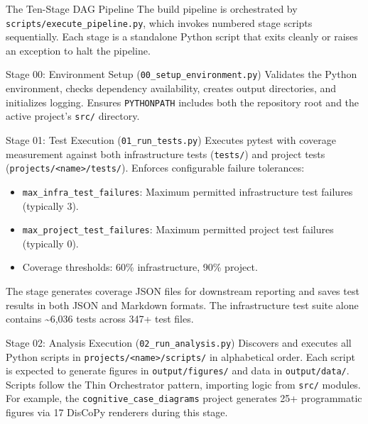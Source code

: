 \documentclass[
  ignorenonframetext,
]{beamer}
\author{\texorpdfstring{}{}}
\date{}
\providecommand{\tightlist}{%
  \setlength{\itemsep}{0pt}\setlength{\parskip}{0pt}}
\begin{document}
\begin{frame}[fragile]{The Ten-Stage DAG Pipeline}
\protect{}\label{the-ten-stage-dag-pipeline}
The build pipeline is orchestrated by
\texttt{scripts/execute\_pipeline.py}, which invokes numbered stage
scripts sequentially. Each stage is a standalone Python script that
exits cleanly or raises an exception to halt the pipeline.

\begin{block}{Stage 00: Environment Setup
(\texttt{00\_setup\_environment.py})}
\protect{}\label{stage-00-environment-setup-00_setup_environment.py}
Validates the Python environment, checks dependency availability,
creates output directories, and initializes logging. Ensures
\texttt{PYTHONPATH} includes both the repository root and the active
project's \texttt{src/} directory.
\end{block}

\begin{block}{Stage 01: Test Execution (\texttt{01\_run\_tests.py})}
\protect{}\label{stage-01-test-execution-01_run_tests.py}
Executes pytest with coverage measurement against both infrastructure
tests (\texttt{tests/}) and project tests
(\texttt{projects/\textless{}name\textgreater{}/tests/}). Enforces
configurable failure tolerances:

\begin{itemize}
\tightlist
\item
  \texttt{max\_infra\_test\_failures}: Maximum permitted infrastructure
  test failures (typically 3).
\item
  \texttt{max\_project\_test\_failures}: Maximum permitted project test
  failures (typically 0).
\item
  Coverage thresholds: 60\% infrastructure, 90\% project.
\end{itemize}

The stage generates coverage JSON files for downstream reporting and
saves test results in both JSON and Markdown formats. The infrastructure
test suite alone contains \textasciitilde6,036 tests across 347+ test
files.
\end{block}

\begin{block}{Stage 02: Analysis Execution
(\texttt{02\_run\_analysis.py})}
\protect{}\label{stage-02-analysis-execution-02_run_analysis.py}
Discovers and executes all Python scripts in
\texttt{projects/\textless{}name\textgreater{}/scripts/} in alphabetical
order. Each script is expected to generate figures in
\texttt{output/figures/} and data in \texttt{output/data/}. Scripts
follow the Thin Orchestrator pattern, importing logic from \texttt{src/}
modules. For example, the \texttt{cognitive\_case\_diagrams} project
generates 25+ programmatic figures via 17 DisCoPy renderers during this
stage.
\end{block}


\end{frame}
\end{document}
